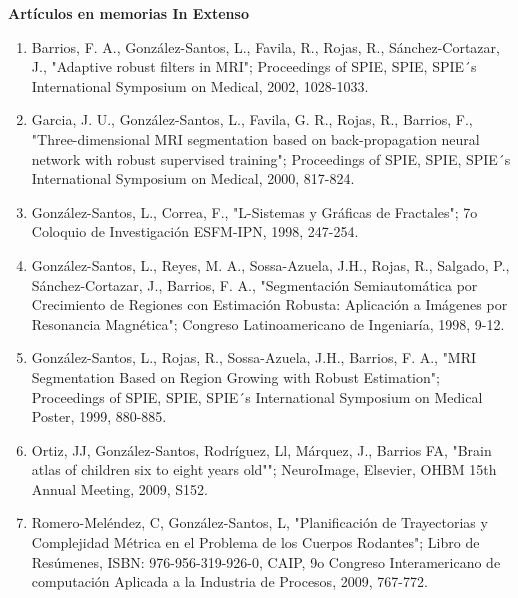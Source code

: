 \textbf{Artículos en memorias In Extenso}

\begin{enumerate}

\item  Barrios, F. A., González-Santos, L., Favila, R., Rojas, R., Sánchez-Cortazar, J.,
"Adaptive robust filters in MRI"; Proceedings of SPIE, SPIE, SPIE´s International Symposium on Medical, 2002, 1028-1033.

\item  Garcia, J. U., González-Santos, L., Favila, G. R., Rojas, R., Barrios, F.,
"Three-dimensional MRI segmentation based on back-propagation neural network with robust supervised training"; Proceedings of 
SPIE, SPIE, SPIE´s International Symposium on Medical, 2000, 817-824.

\item  González-Santos, L., Correa, F.,
"L-Sistemas y Gráficas de Fractales"; 7o Coloquio de Investigación ESFM-IPN, 1998, 247-254.

\item  González-Santos, L., Reyes, M. A., Sossa-Azuela, J.H., Rojas, R., Salgado, P., Sánchez-Cortazar, J., Barrios, F. A.,
"Segmentación Semiautomática por Crecimiento de Regiones con Estimación Robusta: Aplicación a Imágenes por Resonancia 
Magnética"; Congreso Latinoamericano de Ingeniaría, 1998, 9-12.

\item  González-Santos, L., Rojas, R., Sossa-Azuela, J.H., Barrios, F. A.,
"MRI Segmentation Based on Region Growing with Robust Estimation"; Proceedings of SPIE, SPIE, SPIE´s International Symposium 
on Medical Poster, 1999, 880-885.

\item  Ortiz, JJ, González-Santos, Rodríguez, Ll, Márquez, J., Barrios FA,
"Brain atlas of children six to eight years old""; NeuroImage, Elsevier, OHBM 15th Annual Meeting, 2009, S152.

\item  Romero-Meléndez, C, González-Santos, L,
"Planificación de Trayectorias y Complejidad Métrica en el Problema de los Cuerpos Rodantes"; Libro de Resúmenes, ISBN: 
976-956-319-926-0, CAIP, 9o Congreso Interamericano de computación Aplicada a la Industria de Procesos, 2009, 767-772.

\end{enumerate}

